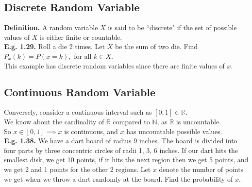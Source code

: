 \documentclass[12pt]{book}
\begin{document}
\subsection{Discrete Random Variable}
\textbf{Definition. } A random variable $X$ is said to be ``discrete" if the set of possible values of $X$ is either finite or countable. \\

\noindent \textbf{E.g. 1.29. } Roll a die 2 times. Let $X$ be the sum of two die. Find $P_x(k)=P(x=k),$ for all $k \in X$.\\
This example has discrete random variables since there are finite values of $x$.\\

\subsection{Continuous Random Variable}
Conversely, consider a continuous interval such as $[0,1]\in \mathbb{R}$.\\
We know about the cardinality of $\mathbb{R}$ compared to $\mathbb{N}$, as $\mathbb{R}$ is uncountable.\\
So $x\in [0,1]\implies x$ is continuous, and $x$ has uncountable possible values.\\

\noindent \textbf{E.g. 1.38. } We have a dart board of radius 9 inches. The board is divided into four parts by three concentric circles of radii 1, 3, 6 inches. If our dart hits the smallest disk, we get 10 points, if it hits the next region then we get 5 points, and we get 2 and 1 points for the other 2 regions. Let $x$ denote the number of points we get when we throw a dart randomly at the board. Find the probability of $x$.\\
\end{document}
